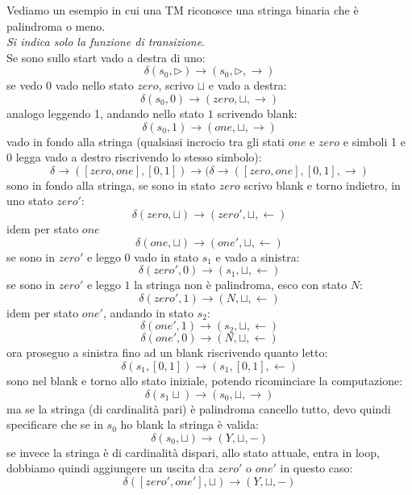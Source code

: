 \begin{esempio}
  Vediamo un esempio in cui una TM riconosce una stringa binaria che è
  palindroma o meno.\\
  \textit{Si indica solo la funzione di transizione}.\\
  Se sono sullo start vado a destra di uno:
  \[\delta(s_0,\triangleright)\to (s_0,\triangleright, \rightarrow)\]
  se vedo 0 vado nello stato $zero$, scrivo $\sqcup$ e vado a destra:
  \[\delta(s_0,0)\to (zero,\sqcup, \rightarrow)\]
  analogo leggendo 1, andando nello stato $1$ scrivendo blank:
  \[\delta(s_0,1)\to (one,\sqcup, \rightarrow)\]
  vado in fondo alla stringa (qualsiasi incrocio tra gli stati $one$ e $zero $ e
  simboli 1 e 0 legga vado a destro riscrivendo lo stesso simbolo):
  \[\delta\to([zero, one],[0,1])\to(\delta\to([zero, one],[0,1],\rightarrow)\]
  sono in fondo alla stringa, se sono in stato $zero$ scrivo blank e torno
  indietro, in uno stato $zero'$:
  \[\delta(zero, \sqcup)\to(zero', \sqcup, \leftarrow)\]
  idem per stato $one$
  \[\delta(one, \sqcup)\to(one', \sqcup, \leftarrow)\]
  se sono in $zero'$ e leggo $0$ vado in stato $s_1$ e vado a sinistra: 
  \[\delta(zero', 0)\to(s_1,\sqcup, \leftarrow)\]
  se sono in $zero'$ e leggo $1$ la stringa non è palindroma, esco con stato
  $N$:
  \[\delta(zero', 1)\to(N,\sqcup, \leftarrow)\]
  idem per stato $one'$, andando in stato $s_2$:
  \[\delta(one', 1)\to(s_2,\sqcup, \leftarrow)\]
  \[\delta(one', 0)\to(N,\sqcup, \leftarrow)\]
  ora proseguo a sinistra fino ad un blank riscrivendo quanto letto:
  \[\delta(s_1,[0,1])\to(s_1,[0,1], \leftarrow)\]
  sono nel blank e torno allo stato iniziale, potendo ricominciare la
  computazione:
  \[\delta(s_1\sqcup)\to(s_0,\sqcup, \rightarrow)\]
  ma se la stringa (di cardinalità pari) è palindroma cancello tutto, devo
  quindi specificare che se in $s_0$ ho blank la stringa è valida:
  \[\delta(s_0,\sqcup)\to(Y, \sqcup,-)\]
  se invece la stringa è di cardinalità dispari, allo stato attuale, entra in
  loop, dobbiamo quindi aggiungere un uscita d:a $zero'$ o $one'$ in questo
  caso:
  \[\delta([zero',one'], \sqcup)\to(Y, \sqcup, -)\]
\end{esempio}

